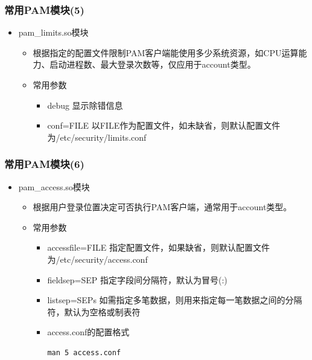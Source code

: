 \documentclass[xcolor=svgnames,presentation]{beamer}
\begin{document}
\begin{frame}
\frametitle{常用PAM模块(5)}
\label{sec-6-14}
\begin{itemize}

\item pam\_limits.so模块
\label{sec-6-14-1}%
\begin{itemize}

\item 根据指定的配置文件限制PAM客户端能使用多少系统资源，如CPU运算能力、启动进程数、最大登录次数等，仅应用于account类型。
\label{sec-6-14-1-1}%

\item 常用参数
\label{sec-6-14-1-2}%
\begin{itemize}

\item debug 显示除错信息
\label{sec-6-14-1-2-1}%

\item conf=FILE 以FILE作为配置文件，如未缺省，则默认配置文件为/etc/security/limits.conf
\label{sec-6-14-1-2-2}%
\end{itemize} %
\end{itemize} %
\end{itemize} %
\end{frame}
\begin{frame}[fragile]
\frametitle{常用PAM模块(6)}
\label{sec-6-15}
\begin{itemize}

\item pam\_access.so模块
\label{sec-6-15-1}%
\begin{itemize}

\item 根据用户登录位置决定可否执行PAM客户端，通常用于account类型。
\label{sec-6-15-1-1}%

\item 常用参数
\label{sec-6-15-1-2}%
\begin{itemize}

\item accessfile=FILE 指定配置文件，如果缺省，则默认配置文件为/etc/security/access.conf
\label{sec-6-15-1-2-1}%

\item fieldsep=SEP 指定字段间分隔符，默认为冒号(:)
\label{sec-6-15-1-2-2}%

\item listsep=SEPs 如需指定多笔数据，则用来指定每一笔数据之间的分隔符，默认为空格或制表符
\label{sec-6-15-1-2-3}%

\item access.conf的配置格式\\
\label{sec-6-15-1-2-4}%
\begin{verbatim}
man 5 access.conf
\end{verbatim}
\end{itemize} %
\end{itemize} %
\end{itemize} %
\end{frame}
\end{document}
